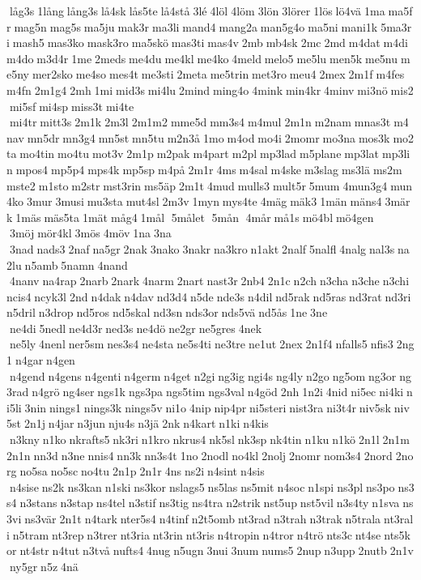  låg3s 1lång lång3s lå4sk lås5te lå4stå 3lé 4löl 4löm 3lön 3lörer 1lös lö4vä 1ma ma5fr mag5n mag5s ma5ju mak3r ma3li mand4 mang2a man5g4o ma5ni mani1k 5ma3ri mash5 mas3ko mask3ro ma5skö mas3ti mas4v 2mb mb4sk 2mc 2md m4dat m4di m4do m3d4r 1me 2meds me4du me4kl me4ko 4meld melo5 me5lu men5k me5nu me5ny mer2sko me4so mes4t me3sti 2meta me5trin met3ro meu4 2mex 2m1f m4fes m4fn 2m1g4 2mh 1mi mid3s mi4lu 2mind ming4o 4mink min4kr 4minv mi3nö mis2 mi5sf mi4sp miss3t mi4te  mi4tr mitt3s 2m1k 2m3l 2m1m2 mme5d mm3s4 m4mul 2m1n m2nam mnas3t m4nav mn5dr mn3g4 mn5st mn5tu m2n3å 1mo m4od mo4i 2momr mo3na mos3k mo2ta mo4tin mo4tu mot3v 2m1p m2pak m4part m2pl mp3lad m5plane mp3lat mp3lin mpos4 mp5p4 mps4k mp5sp m4på 2m1r 4ms m4sal m4ske m3slag ms3lä ms2m mste2 m1sto m2str mst3rin ms5äp 2m1t 4mud mulls3 mult5r 5mum 4mun3g4 mun4ko 3mur 3musi mu3sta mut4sl 2m3v 1myn mys4te 4mäg mäk3 1män mäns4 3märk 1mäs mäs5ta 1mät måg4 1mål  5målet  5mån  4mår må1s mö4bl mö4gen  3möj mör4kl 3mös 4möv 1na 3na  3nad nads3 2naf na5gr 2nak 3nako 3nakr na3kro n1akt 2nalf 5nalfl 4nalg nal3s na2lu n5amb 5namn 4nand  4nanv na4rap 2narb 2nark 4narm 2nart nast3r 2nb4 2n1c n2ch n3cha n3che n3chi ncis4 ncyk3l 2nd n4dak n4dav nd3d4 n5de nde3s n4dil nd5rak nd5ras nd3rat nd3ri n5dril n3drop nd5ros nd5skal nd3sn nds3or nds5vä nd5ås 1ne 3ne  ne4di 5nedl ne4d3r ned3s ne4dö ne2gr ne5gres 4nek  ne5ly 4nenl ner5sm nes3s4 ne4sta ne5s4ti ne3tre ne1ut 2nex 2n1f4 nfalls5 nfis3 2ng1 n4gar n4gen  n4gend n4gens n4genti n4germ n4get n2gi ng3ig ngi4s ng4ly n2go ng5om ng3or ng3rad n4grö ng4ser ngs1k ngs3pa ngs5tim ngs3val n4göd 2nh 1n2i 4nid ni5ec ni4ki ni5li 3nin nings1 nings3k nings5v ni1o 4nip nip4pr ni5steri nist3ra ni3t4r niv5sk niv5st 2n1j n4jar n3jun nju4s n3jä 2nk n4kart n1ki n4kis  n3kny n1ko nkrafts5 nk3ri n1kro nkrus4 nk5sl nk3sp nk4tin n1ku n1kö 2n1l 2n1m 2n1n nn3d n3ne nnis4 nn3k nn3s4t 1no 2nodl no4kl 2nolj 2nomr nom3s4 2nord 2norg no5sa no5sc no4tu 2n1p 2n1r 4ns ns2i n4sint n4sis  n4sise ns2k ns3kan n1ski ns3kor nslags5 ns5las ns5mit n4soc n1spi ns3pl ns3po ns3s4 n3stans n3stap ns4tel n3stif ns3tig ns4tra n2strik nst5up nst5vil n3s4ty n1sva ns3vi ns3vär 2n1t n4tark nter5s4 n4tinf n2t5omb nt3rad n3trah n3trak n5trala nt3rali n5tram nt3rep n3trer nt3ria nt3rin nt3ris n4tropin n4tror n4trö nts3c nt4se nts5kor nt4str n4tut n3två nufts4 4nug n5ugn 3nui 3num nums5 2nup n3upp 2nutb 2n1v ny5gr n5z 4nä 